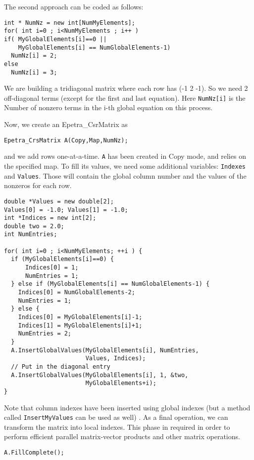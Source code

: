 The second approach can be coded as follows:
\begin{verbatim}
int * NumNz = new int[NumMyElements];
for( int i=0 ; i<NumMyElements ; i++ )
if( MyGlobalElements[i]==0 || 
    MyGlobalElements[i] == NumGlobalElements-1)
  NumNz[i] = 2;
else
  NumNz[i] = 3;
\end{verbatim}
We are building a tridiagonal matrix where each row has (-1 2 -1). So we
need 2 off-diagonal terms (except for the first and last equation). Here
\verb!NumNz[i]! is the Number of nonzero terms in the i-th global
equation on this process.

Now, we create an Epetra\_CsrMatrix as
\begin{verbatim}
Epetra_CrsMatrix A(Copy,Map,NumNz);
\end{verbatim}
and we add rows one-at-a-time. \verb!A! has been created in Copy mode,
and relies on the specified map. To fill its values, we need some
additional variables: \verb!Indexes! and \verb!Values!. Those will
contain the global column number and the values of the nonzeros for each
row.
\begin{verbatim}
double *Values = new double[2];
Values[0] = -1.0; Values[1] = -1.0;
int *Indices = new int[2];
double two = 2.0;
int NumEntries;

for( int i=0 ; i<NumMyElements; ++i ) {
  if (MyGlobalElements[i]==0) {
      Indices[0] = 1;
      NumEntries = 1;
  } else if (MyGlobalElements[i] == NumGlobalElements-1) {
    Indices[0] = NumGlobalElements-2;
    NumEntries = 1;
  } else {
    Indices[0] = MyGlobalElements[i]-1;
    Indices[1] = MyGlobalElements[i]+1;
    NumEntries = 2;
  }
  A.InsertGlobalValues(MyGlobalElements[i], NumEntries, 
                       Values, Indices);
  // Put in the diagonal entry
  A.InsertGlobalValues(MyGlobalElements[i], 1, &two, 
                       MyGlobalElements+i);
}
\end{verbatim}
Note that column indexes have been inserted using global indexes (but a
method called \verb!InsertMyValues! can be used as well) .  As a final
operation, we can transform the matrix into local indexes. This phase in
required in order to perform efficient parallel matrix-vector products
and other matrix operations.
\begin{verbatim}
A.FillComplete();
\end{verbatim}

